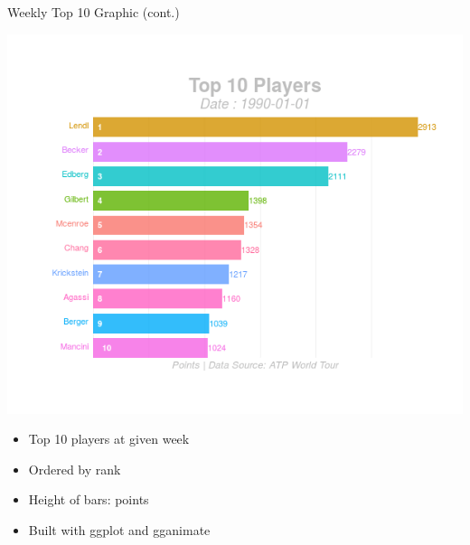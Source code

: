 \documentclass[ignorenonframetext,]{beamer}
\providecommand{\tightlist}{%
  \setlength{\itemsep}{0pt}\setlength{\parskip}{0pt}}
\begin{document}
\begin{frame}{Weekly Top 10 Graphic (cont.)}
\protect\hypertarget{weekly-top-10-graphic-cont.}{}

\includegraphics{gganim_test3.gif}

\begin{itemize}[<+->]
\tightlist
\item
  Top 10 players at given week
\item
  Ordered by rank
\item
  Height of bars: points
\item
  Built with ggplot and gganimate
\end{itemize}

\end{frame}
\end{document}
